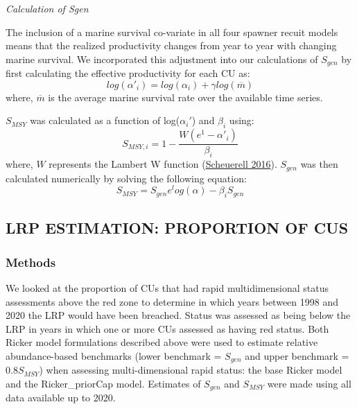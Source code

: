 \documentclass[11pt]{book}
\begin{document}
\emph{Calculation of Sgen}

The inclusion of a marine survival co-variate in all four spawner recuit models means that the realized productivity changes from year to year with changing marine survival. We incorporated this adjustment into our calculations of \(S_{gen}\) by first calculating the effective productivity for each CU as:
\begin{equation}
  log(\alpha'_{i}) = log(\alpha_i) + \gamma log(\overline{m})
   \label{eq:adjProd}
\end{equation}
where, \(\overline{m}\) is the average marine survival rate over the available time series.

\(S_{MSY}\) was calculated as a function of log(\(\alpha_i'\)) and \(\beta_i\) using:
\begin{equation}
  S_{MSY,i} = 1 - \frac{W(e^1-\alpha'_i)}{\beta_i} 
   \label{eq:Smsy}
\end{equation}
where, \(W\) represents the Lambert W function (\protect\hyperlink{ref-scheuerellExplicitSolutionCalculating2016}{Scheuerell 2016}). \(S_{gen}\) was then calculated numerically by solving the following equation:
\begin{equation}
  S_{MSY} = S_{gen}e^log(\alpha)-\beta_iS_{gen}
  \label{eq:Sgen}
\end{equation}
\hypertarget{lrp-estimation-proportion-of-cus}{%
\subsection{LRP ESTIMATION: PROPORTION OF CUS}\label{lrp-estimation-proportion-of-cus}}

\hypertarget{methods}{%
\subsubsection{Methods}\label{methods}}

We looked at the proportion of CUs that had rapid multidimensional status assessments above the red zone to determine in which years between 1998 and 2020 the LRP would have been breached. Status was assessed as being below the LRP in years in which one or more CUs assessed as having red status. Both Ricker model formulations described above were used to estimate relative abundance-based benchmarks (lower benchmark = \(S_{gen}\) and upper benchmark = 0.8\(S_{MSY}\)) when assessing multi-dimensional rapid status: the base Ricker model and the Ricker\_priorCap model. Estimates of \(S_{gen}\) and \(S_{MSY}\) were made using all data available up to 2020.
\end{document}
